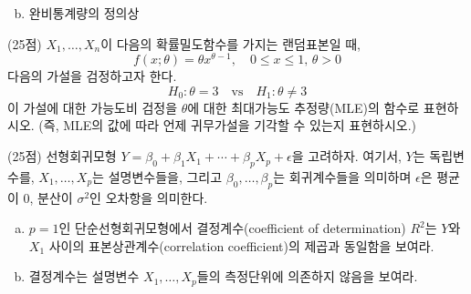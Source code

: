 \documentclass[answers]{exam}
\begin{document}
\begin{questions}
\begin{solution}
\begin{enumerate}[(a)]
\begin{equation}
        \end{equation}
        \item 완비통계량의 정의상 
      \end{enumerate}
    \end{solution}
    \question
    (25점) $X_{1},\ldots,X_{n}$이 다음의 확률밀도함수를 가지는 랜덤표본일 때,
    $$
      f\left(x;\theta\right)=\theta x^{\theta-1},\quad 0\leq x \leq 1,\, \theta>0
    $$
    다음의 가설을 검정하고자 한다.
    $$
      H_{0}:\theta=3 \quad \text{vs} \quad H_{1}:\theta\neq 3
    $$
    이 가설에 대한 가능도비 검정을 $\theta$에 대한 최대가능도 추정량(MLE)의 함수로 표현하시오. (즉, MLE의 값에 따라 언제 귀무가설을 기각할 수 있는지 표현하시오.)
    \begin{solution}

    \end{solution}
    \question
    (25점) 선형회귀모형 $Y=\beta_{0}+\beta_{1}X_{1}+\cdots+\beta_{p}X_{p}+\epsilon$을 고려하자. 여기서, $Y$는 독립변수를, $X_{1},\ldots,X_{p}$는 설명변수들을, 그리고 $\beta_{0},\ldots, \beta_{p}$는 회귀계수들을 의미하며 $\epsilon$은 평균이 $0$, 분산이 $\sigma^{2}$인 오차항을 의미한다.
    \begin{enumerate}[(a)]
      \item $p=1$인 단순선형회귀모형에서 결정계수(coefficient of determination) $R^{2}$는 $Y$와 $X_{1}$ 사이의 표본상관계수(correlation coefficient)의 제곱과 동일함을 보여라.
      \item 결정계수는 설명변수 $X_{1},\ldots,X_{p}$들의 측정단위에 의존하지 않음을 보여라.
    \end{enumerate}
    \begin{solution}

    \end{solution}
\end{questions}
\end{document}
